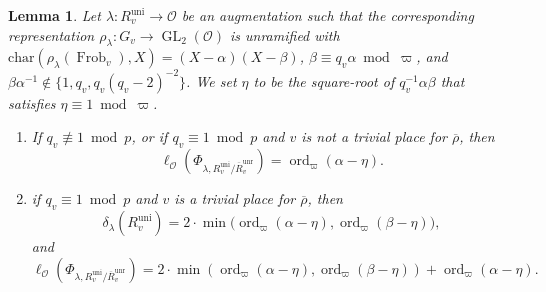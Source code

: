\documentclass[a4paper, notitlepage, 10pt]{amsart}
\theoremstyle{plain} %
\newtheorem{lemma}[theorem]{Lemma}
\theoremstyle{definition} %
\theoremstyle{remark} %
\numberwithin{equation}{section}
\newcommand{\GL}{\operatorname{GL}} %
\newcommand{\Frob}{\operatorname{Frob}} %
\newcommand{\ord}{\operatorname{ord}} %
\newcommand{\uni}{\operatorname{uni}}
\newcommand{\unr}{\operatorname{unr}}
\begin{document}
\begin{lemma}\label{cotangentuni}
Let $\lambda\colon R^{\uni}_v\to \mathcal{O}$ be an augmentation such that the corresponding representation $\rho_\lambda\colon G_v\to \GL_2(\mathcal{O})$ is unramified with $\mathrm{char}(\rho_\lambda(\Frob_v),X)=(X-\alpha)(X-\beta)$, $\beta\equiv q_v\alpha \bmod \varpi$, and $\beta\alpha^{-1}\not\in \{1,q_v,q_v(q_v-2)^{-2}\}$. We set $\eta$ to be the square-root of $q_v^{-1}\alpha\beta$ that satisfies $\eta\equiv 1 \bmod \varpi$.
\begin{enumerate}
    \item If $q_v\not\equiv 1 \bmod p$, or if $q_v\equiv 1 \bmod p $ and $v$ is not a trivial place for  $\overline{\rho}$, then  
    $$\ell_{\mathcal{O}}(\Phi_{\lambda,R^{\uni}_v/\overline{R}^{\unr}_v})=\ord_{\varpi}(\alpha-\eta).$$
    \item if $q_v\equiv 1 \bmod p$ and $v$ is a trivial place for $\overline{\rho}$, then
    $$ \delta_\lambda(R^{\uni}_v)=2\cdot\min\big(\ord_\varpi(\alpha-\eta),\ord_\varpi(\beta-\eta)\big),$$
    and
    $$ \ell_{\mathcal{O}}(\Phi_{\lambda,R^{\uni}_v/\overline{R}^{\unr}_v})=2\cdot \min(\ord_{\varpi}(\alpha-\eta),\ord_{\varpi}(\beta-\eta))+\ord_{\varpi}(\alpha-\eta). $$
\end{enumerate}
\end{lemma}
\end{document}

